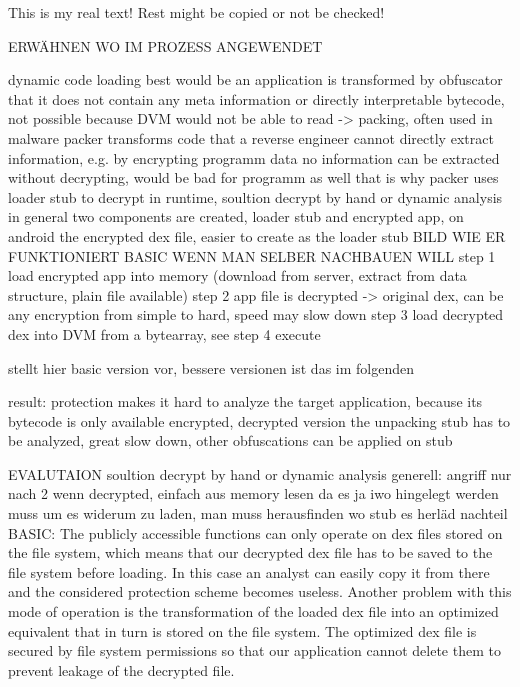 This is my real text! Rest might be copied or not be checked!

ERWÄHNEN WO IM PROZESS ANGEWENDET\newline


%
dynamic code loading
best would be an application is transformed by obfuscator that it does not contain any meta information or directly interpretable bytecode, not possible because DVM would not be able to read -> packing, often used in malware \cite{packerProblemSolution}\newline
packer transforms code that a reverse engineer cannot directly extract information, e.g. by encrypting programm data no information can be extracted without decrypting, would be bad for programm as well that is why packer uses loader stub to decrypt in runtime, soultion decrypt by hand or dynamic analysis\newline
in general two components are created, loader stub and encrypted app, on android the encrypted dex file, easier to create as the loader stub\newline
BILD WIE ER FUNKTIONIERT
BASIC WENN MAN SELBER NACHBAUEN WILL
step 1 load encrypted app into memory (download from server, extract from data structure, plain file available)
step 2 app file is decrypted -> original dex, can be any encryption from simple to hard, speed may slow down
step 3 load decrypted dex into DVM from a bytearray, see \cite{schulzCodeProtection}
step 4 execute\newline

\cite{schulzCodeProtection} stellt hier basic version vor, bessere versionen ist das im folgenden

result: protection makes it hard to analyze the target application, because its bytecode is only available encrypted, decrypted version the unpacking stub has to be analyzed, great slow down, other obfuscations can be applied on stub
%

%
EVALUTAION\newline
soultion decrypt by hand or dynamic analysis\newline
generell: angriff nur nach 2 wenn decrypted, einfach aus memory lesen da es ja iwo hingelegt werden muss um es widerum zu laden, man muss herausfinden wo stub es herläd\newline
nachteil BASIC: The publicly accessible functions can only operate on dex files stored on the file system, which means that our decrypted dex file has to be saved to the file system before loading. In this case an analyst can easily copy it from there and the considered protection scheme becomes useless. Another problem with this mode of operation is the transformation of the loaded dex file into an optimized equivalent that in turn is stored on the file system. The optimized dex file is secured by file system permissions so that our application cannot delete them to prevent leakage of the decrypted file. \newline
%

